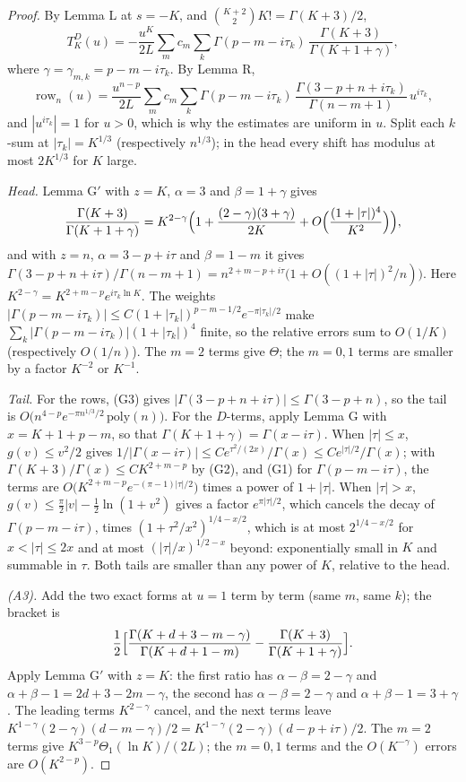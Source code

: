 \documentclass[11pt]{article}
\newcommand{\row}{\operatorname{row}}
\begin{document}
\begin{proof}
By Lemma L at $s=-K$, and $\binom{K+2}{2}K!=\Gamma(K+3)/2$,
\[
T^D_K(u)=-\frac{u^K}{2L}\sum_mc_m\sum_k\Gamma(p-m-i\tau_k)\,\frac{\Gamma(K+3)}{\Gamma(K+1+\gamma)},
\]
where $\gamma=\gamma_{m,k}=p-m-i\tau_k$. By Lemma R,
\[
\row_n(u)=\frac{u^{n-p}}{2L}\sum_mc_m\sum_k\Gamma(p-m-i\tau_k)\,\frac{\Gamma(3-p+n+i\tau_k)}{\Gamma(n-m+1)}\,u^{i\tau_k},
\]
and $|u^{i\tau_k}|=1$ for $u>0$, which is why the estimates are uniform in $u$. Split each $k$-sum at $|\tau_k|=K^{1/3}$ (respectively $n^{1/3}$); in the head every shift has modulus at most $2K^{1/3}$ for $K$ large.

\emph{Head.} Lemma G$'$ with $z=K$, $\alpha=3$ and $\beta=1+\gamma$ gives
\[
\frac{\Gamma(K+3)}{\Gamma(K+1+\gamma)}=K^{2-\gamma}\Bigl(1+\frac{(2-\gamma)(3+\gamma)}{2K}+O\Bigl(\frac{(1+|\tau|)^4}{K^2}\Bigr)\Bigr),
\]
and with $z=n$, $\alpha=3-p+i\tau$ and $\beta=1-m$ it gives $\Gamma(3-p+n+i\tau)/\Gamma(n-m+1)=n^{2+m-p+i\tau}\bigl(1+O((1+|\tau|)^2/n)\bigr)$. Here $K^{2-\gamma}=K^{2+m-p}e^{i\tau_k\ln K}$. The weights $|\Gamma(p-m-i\tau_k)|\le C(1+|\tau_k|)^{p-m-1/2}e^{-\pi|\tau_k|/2}$ make $\sum_k|\Gamma(p-m-i\tau_k)|(1+|\tau_k|)^4$ finite, so the relative errors sum to $O(1/K)$ (respectively $O(1/n)$). The $m=2$ terms give $\Theta$; the $m=0,1$ terms are smaller by a factor $K^{-2}$ or $K^{-1}$.

\emph{Tail.} For the rows, (G3) gives $|\Gamma(3-p+n+i\tau)|\le\Gamma(3-p+n)$, so the tail is $O\bigl(n^{4-p}e^{-\pi n^{1/3}/2}\,\mathrm{poly}(n)\bigr)$. For the $D$-terms, apply Lemma G with $x=K+1+p-m$, so that $\Gamma(K+1+\gamma)=\Gamma(x-i\tau)$. When $|\tau|\le x$, $g(v)\le v^2/2$ gives $1/|\Gamma(x-i\tau)|\le Ce^{\tau^2/(2x)}/\Gamma(x)\le Ce^{|\tau|/2}/\Gamma(x)$; with $\Gamma(K+3)/\Gamma(x)\le CK^{2+m-p}$ by (G2), and (G1) for $\Gamma(p-m-i\tau)$, the terms are $O\bigl(K^{2+m-p}e^{-(\pi-1)|\tau|/2}\bigr)$ times a power of $1+|\tau|$. When $|\tau|>x$, $g(v)\le\frac\pi2|v|-\frac12\ln(1+v^2)$ gives a factor $e^{\pi|\tau|/2}$, which cancels the decay of $\Gamma(p-m-i\tau)$, times $(1+\tau^2/x^2)^{1/4-x/2}$, which is at most $2^{1/4-x/2}$ for $x<|\tau|\le2x$ and at most $(|\tau|/x)^{1/2-x}$ beyond: exponentially small in $K$ and summable in $\tau$. Both tails are smaller than any power of $K$, relative to the head.

\emph{(A3).} Add the two exact forms at $u=1$ term by term (same $m$, same $k$); the bracket is
\[
\frac12\Bigl[\frac{\Gamma(K+d+3-m-\gamma)}{\Gamma(K+d+1-m)}-\frac{\Gamma(K+3)}{\Gamma(K+1+\gamma)}\Bigr].
\]
Apply Lemma G$'$ with $z=K$: the first ratio has $\alpha-\beta=2-\gamma$ and $\alpha+\beta-1=2d+3-2m-\gamma$, the second has $\alpha-\beta=2-\gamma$ and $\alpha+\beta-1=3+\gamma$. The leading terms $K^{2-\gamma}$ cancel, and the next terms leave $K^{1-\gamma}(2-\gamma)(d-m-\gamma)/2=K^{1-\gamma}(2-\gamma)(d-p+i\tau)/2$. The $m=2$ terms give $K^{3-p}\Theta_1(\ln K)/(2L)$; the $m=0,1$ terms and the $O(K^{-\gamma})$ errors are $O(K^{2-p})$.
\end{proof}
\end{document}
